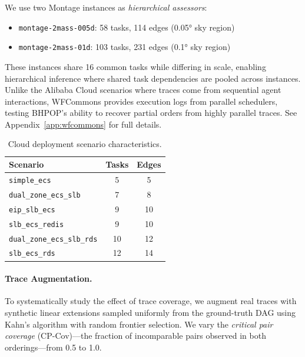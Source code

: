We use two Montage instances as \emph{hierarchical assessors}:
\begin{itemize}[leftmargin=*,nosep]
    \item \texttt{montage-2mass-005d}: 58 tasks, 114 edges (0.05° sky region)
    \item \texttt{montage-2mass-01d}: 103 tasks, 231 edges (0.1° sky region)
\end{itemize}
These instances share 16 common tasks while differing in scale, enabling hierarchical inference where shared task dependencies are pooled across instances. Unlike the Alibaba Cloud scenarios where traces come from sequential agent interactions, WFCommons provides execution logs from parallel schedulers, testing \textsc{BHPOP}'s ability to recover partial orders from highly parallel traces. See Appendix~\ref{app:wfcommons} for full details.

\begin{table}[t]
\caption{Cloud deployment scenario characteristics.}
\label{tab:scenarios}
\centering
\small
\begin{tabular}{lcc}
\toprule
\textbf{Scenario} & \textbf{Tasks} & \textbf{Edges} \\
\midrule
\texttt{simple\_ecs} & 5 & 5 \\
\texttt{dual\_zone\_ecs\_slb} & 7 & 8 \\
\texttt{eip\_slb\_ecs} & 9 & 10 \\
\texttt{slb\_ecs\_redis} & 9 & 10 \\
\texttt{dual\_zone\_ecs\_slb\_rds} & 10 & 12 \\
\texttt{slb\_ecs\_rds} & 12 & 14 \\
\bottomrule
\end{tabular}
\end{table}

\paragraph{Trace Augmentation.}
To systematically study the effect of trace coverage, we augment real traces with synthetic linear extensions sampled uniformly from the ground-truth DAG using Kahn's algorithm with random frontier selection. We vary the \emph{critical pair coverage} (CP-Cov)---the fraction of incomparable pairs observed in both orderings---from 0.5 to 1.0.

